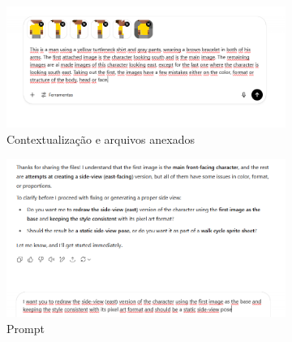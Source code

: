 \begin{figure}[htbp]
    \centering
    \caption{\small Processo da utilização 3 do ChatGPTem julho/2025}
    \label{fig:chatGPT3}

    \begin{subfigure}{0.75\linewidth}
        \includegraphics[width=1\linewidth]{figs/chatGPT/visao_lateral/tela3.PNG}
        \caption{\small Contextualização e arquivos anexados}
        \label{fig:chatGPT3a}
    \end{subfigure}
    \begin{subfigure}{0.75\linewidth}
        \includegraphics[width=1\linewidth]{figs/chatGPT/visao_lateral/tela4.PNG}
        \caption{\small Prompt}
        \label{fig:chatGPT3b}
    \end{subfigure}
        \begin{subfigure}{0.2\linewidth}

\end{subfigure}
\end{figure}
